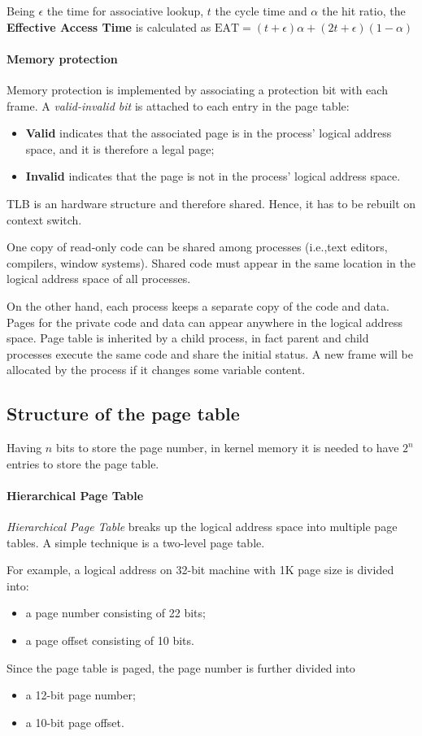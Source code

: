 Being $\epsilon$ the time for associative lookup, $t$  the cycle time and $\alpha$ the hit ratio, the \textbf{Effective Access Time} is calculated as $\text{EAT} = (t + \epsilon) \alpha + (2 t + \epsilon)(1 - \alpha)$

\paragraph{Memory protection} Memory protection is implemented by associating a protection bit with each frame. A \emph{valid-invalid bit} is attached to each entry in the page table:

\begin{itemize}
\item \textbf{Valid} indicates that the associated page is in the process' logical address space, and it is therefore a legal page;
\item \textbf{Invalid} indicates that the page is not in the process' logical address space.
\end{itemize}
TLB is an hardware structure and therefore shared. Hence, it has to be rebuilt on context switch.

One copy of read-only code can be shared among processes (i.e.,\@ text editors, compilers, window systems). Shared code must appear in the same location in the logical address space of all processes.

On the other hand, each process keeps a separate copy of the code and data. Pages for the private code and data can appear anywhere in the logical address space. Page table is inherited by a child process, in fact parent and child processes execute the same code and share the initial status. A new frame will be allocated by the process if it changes some variable content.

\subsection{Structure of the page table}
Having $n$ bits to store the page number, in kernel memory it is needed to have $2^n$ entries to store the page table.
\paragraph{Hierarchical Page Table} \emph{Hierarchical Page Table} breaks up the logical address space into multiple page tables. A simple technique is a two-level page table.

For example, a logical address on 32-bit machine with 1K page size is divided into:
\begin{itemize}
\item a page number consisting of 22 bits;
\item a page offset consisting of 10 bits.
\end{itemize}
Since the page table is paged, the page number is further divided into
\begin{itemize}
\item a 12-bit page number;
\item a 10-bit page offset.
\end{itemize}

